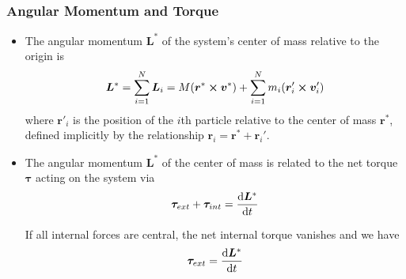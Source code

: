 \documentclass[11pt, a4paper]{article}
\begin{document}
\subsubsection{Angular Momentum and Torque}
\begin{itemize}
	\item The angular momentum $ \bm{L}^* $ of the system's center of mass relative to the origin is
	\begin{align*}
		\bm{L}^* = \sum_{i=1}^{N} \bm{L}_{i} = M (\bm{r}^* \cross \bm{v}^*) + \sum_{i=1}^{N} m_i( \bm{r}_{i}' \cross \bm{v}_{i}')
	\end{align*}
	where $ \bm{r}'_{i} $ is the position of the $ i $th particle relative to the center of mass $ \bm{r^*} $, defined implicitly by the relationship $ \bm{r}_{i} = \bm{r}^* + \bm{r}_{i}' $.
	
	\item The angular momentum $ \bm{L}^* $ of the center of mass is related to the net torque $ \bm{\tau} $ acting on the system via
	\begin{align*}
		\bm{\tau}_{ext} + \bm{\tau}_{int} = \dv{\bm{L}^*}{t}
	\end{align*}
	
	If all internal forces are central, the net internal torque vanishes and we have
	\begin{align*}
		\bm{\tau}_{ext} = \dv{\bm{L}^*}{t}
	\end{align*}
\end{itemize}
\end{document}
